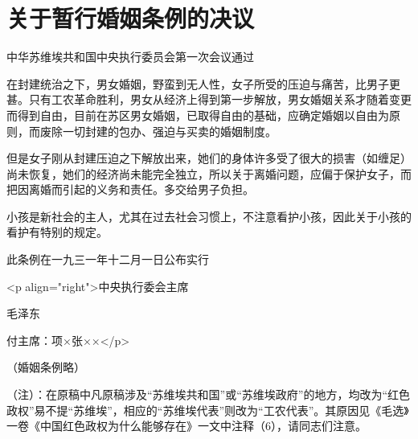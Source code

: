 \section[关于暂行婚姻条例的决议（一九三一年十一月二十八日）]{关于暂行婚姻条例的决议}


中华苏维埃共和国中央执行委员会第一次会议通过

在封建统治之下，男女婚姻，野蛮到无人性，女子所受的压迫与痛苦，比男子更甚。只有工农革命胜利，男女从经济上得到第一步解放，男女婚姻关系才随着变更而得到自由，目前在苏区男女婚姻，已取得自由的基础，应确定婚姻以自由为原则，而废除一切封建的包办、强迫与买卖的婚姻制度。

但是女子刚从封建压迫之下解放出来，她们的身体许多受了很大的损害（如缠足）尚未恢复，她们的经济尚未能完全独立，所以关于离婚问题，应偏于保护女子，而把因离婚而引起的义务和责任。多交给男子负担。

小孩是新社会的主人，尤其在过去社会习惯上，不注意看护小孩，因此关于小孩的看护有特别的规定。

此条例在一九三一年十二月一日公布实行

<p align="right">中央执行委会主席

毛泽东

付主席：项×张××</p>

（婚姻条例略）

（注）：在原稿中凡原稿涉及“苏维埃共和国”或“苏维埃政府”的地方，均改为“红色政权”易不提“苏维埃”，相应的“苏维埃代表”则改为“工农代表”。其原因见《毛选》一卷《中国红色政权为什么能够存在》一文中注释（6），请同志们注意。

